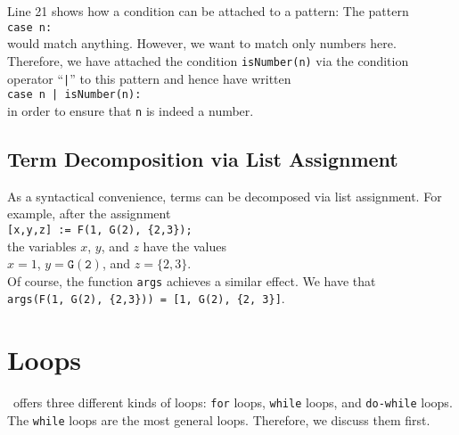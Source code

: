 Line 21 shows how a condition can be attached to a pattern:  The pattern 
\\[0.2cm]
\hspace*{1.3cm}
\texttt{case n:}
\\[0.2cm]
would match anything.  However, we want to match only numbers here.  Therefore, we have attached
the condition \texttt{isNumber(n)} via the condition operator ``\texttt{|}'' to this pattern and
hence have written 
\\[0.2cm]
\hspace*{1.3cm}
\texttt{case n | isNumber(n):}
\\[0.2cm]
in order to ensure that \texttt{n} is indeed a number.

\subsection{Term Decomposition via List Assignment}
As a syntactical convenience, terms can be decomposed via list assignment.  For example, after the assignment
\\[0.2cm]
\hspace*{1.3cm}
\texttt{[x,y,z] := F(1, G(2), \{2,3\});}
\\[0.2cm]
the variables $x$, $y$, and $z$ have the values
\\[0.2cm]
\hspace*{1.3cm}
$x = 1$, \quad $y = \mathtt{G(2)}$, \quad and \quad $z = \{2,3\}$.
\\[0.2cm]
Of course, the function \texttt{args} achieves a similar effect.  We have that
\\[0.2cm]
\hspace*{1.3cm}
\texttt{args(F(1, G(2), \{2,3\})) = [1, G(2), \{2, 3\}]}.

\section{Loops}
\setlx\ offers three different kinds of loops: \texttt{for} loops, \texttt{while} loops, and
\texttt{do-while} loops.  The \texttt{while} loops are the most general loops.  Therefore, we discuss them first.  

